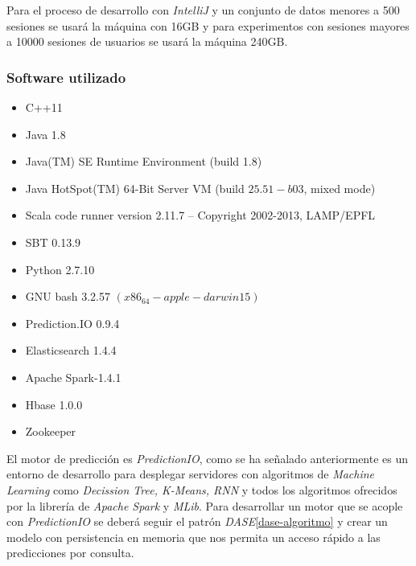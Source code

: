 Para el proceso de desarrollo con \emph{IntelliJ} y un conjunto de datos menores a 500 sesiones se usará la máquina con 16GB y para experimentos con sesiones mayores a 10000 sesiones de usuarios se usará la máquina 240GB.	
	

\subsubsection{Software utilizado}

	\begin{itemize}
		\menorEspacioItemize
	
		\item C++11
		\item Java  1.8
		\item Java(TM) SE Runtime Environment (build 1.8)
		\item Java HotSpot(TM) 64-Bit Server VM (build $25.51-b03$, mixed mode)
		\item Scala code runner version 2.11.7 -- Copyright 2002-2013, LAMP/EPFL
		\item SBT 0.13.9 
		\item Python 2.7.10
		\item GNU bash 3.2.57 $(x86_64-apple-darwin15)$
		\item Prediction.IO 0.9.4
		\item Elasticsearch 1.4.4	
		\item Apache Spark-1.4.1
		\item Hbase 1.0.0
		\item Zookeeper 
	\end{itemize}







El motor de predicción es \emph{PredictionIO}, como se ha señalado anteriormente  es un entorno de desarrollo para desplegar servidores con algoritmos de \emph{Machine Learning} como  \emph{Decission Tree, K-Means, RNN} y todos los algoritmos ofrecidos por la librería de \emph{Apache Spark} y \emph{MLib}. Para desarrollar un motor que se acople con \emph{PredictionIO} se deberá seguir el patrón \emph{DASE}\ref{dase-algoritmo} y crear un modelo con persistencia en memoria que nos permita un acceso rápido a las predicciones por consulta.


